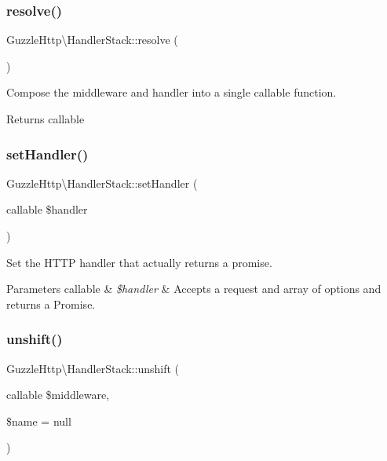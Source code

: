 \subsubsection{\texorpdfstring{resolve()}{resolve()}}
{\footnotesize\ttfamily Guzzle\+Http\textbackslash{}\+Handler\+Stack\+::resolve (\begin{DoxyParamCaption}{ }\end{DoxyParamCaption})}

Compose the middleware and handler into a single callable function.

\begin{DoxyReturn}{Returns}
callable 
\end{DoxyReturn}
\mbox{\label{classGuzzleHttp_1_1HandlerStack_abe01e072281e5c70dbb03db23bde22f0}} 
\subsubsection{\texorpdfstring{set\+Handler()}{setHandler()}}
{\footnotesize\ttfamily Guzzle\+Http\textbackslash{}\+Handler\+Stack\+::set\+Handler (\begin{DoxyParamCaption}\item[{callable}]{\$handler }\end{DoxyParamCaption})}

Set the H\+T\+TP handler that actually returns a promise.


\begin{DoxyParams}[1]{Parameters}
callable & {\em \$handler} & Accepts a request and array of options and returns a Promise. \\
\hline
\end{DoxyParams}
\mbox{\label{classGuzzleHttp_1_1HandlerStack_a545c84f9b80b8a4b66ff845c45484808}} 
\subsubsection{\texorpdfstring{unshift()}{unshift()}}
{\footnotesize\ttfamily Guzzle\+Http\textbackslash{}\+Handler\+Stack\+::unshift (\begin{DoxyParamCaption}\item[{callable}]{\$middleware,  }\item[{}]{\$name = {\ttfamily null} }\end{DoxyParamCaption})}

